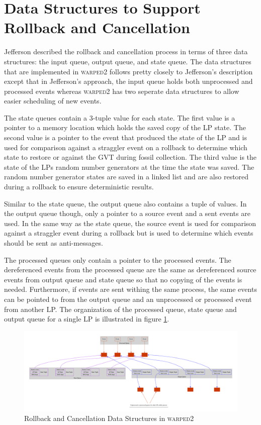 \documentclass[11pt]{book}
\begin{document}
\section{Data Structures to Support Rollback and Cancellation}

Jefferson\cite{jefferson-85} described the rollback and cancellation process in terms of three
data structures: the input queue, output queue, and state queue. The data structures that are
implemented in \textsc{warped2} follows pretty closely to Jefferson's description except that
in Jefferson's approach, the input queue holds both unprocessed and processed events whereas
\textsc{warped2} has two seperate data structures to allow easier scheduling of new events.

The state queues contain a 3-tuple value for each state. The first value is a pointer to a
memory location which holds the saved copy of the LP state. The second value is a pointer to the
event that produced the state of the LP and is used for comparison against a straggler event
on a rollback to determine which state to restore or against the GVT during fossil collection.
The third value is the state of the LPs random number generators at the time the state was saved.
The random number generator states are saved in a linked list and are also restored during a
rollback to ensure deterministic results.

Similar to the state queue, the output queue also contains a tuple of values. In the output
queue though, only a pointer to a source event and a sent events are used. In the same way
as the state queue, the source event is used for comparison against a straggler event during
a rollback but is used to determine which events should be sent as anti-messages.

The processed queues only contain a pointer to the processed events. The dereferenced events
from the processed queue are the same as dereferenced source events from output queue and state
queue so that no copying of the events is needed. Furthermore, if events are sent withing the
same process, the same events can be pointed to from the output queue and an unprocessed or
processed event from another LP. The organization of the processed queue, state queue and output
queue for a single LP is illustrated in figure \ref{rollback_ds}.

\begin{figure}[H]
    \centering
    \includegraphics[width=\textwidth,quiet]{figs/graphviz/rollback_ds.pdf}
    \caption{Rollback and Cancellation Data Structures in \textsc{warped2}}\label{rollback_ds}
\end{figure}
\end{document}
